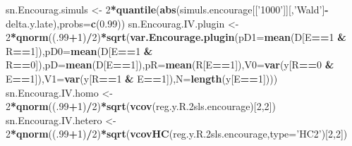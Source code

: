 \documentclass[]{book}
\newenvironment{Shaded}{\begin{snugshade}}{\end{snugshade}}
\newcommand{\KeywordTok}[1]{\textcolor[rgb]{0.13,0.29,0.53}{\textbf{#1}}}
\newcommand{\DataTypeTok}[1]{\textcolor[rgb]{0.13,0.29,0.53}{#1}}
\newcommand{\DecValTok}[1]{\textcolor[rgb]{0.00,0.00,0.81}{#1}}
\newcommand{\FloatTok}[1]{\textcolor[rgb]{0.00,0.00,0.81}{#1}}
\newcommand{\StringTok}[1]{\textcolor[rgb]{0.31,0.60,0.02}{#1}}
\newcommand{\OperatorTok}[1]{\textcolor[rgb]{0.81,0.36,0.00}{\textbf{#1}}}
\newcommand{\NormalTok}[1]{#1}
\theoremstyle{definition}
\theoremstyle{definition}
\theoremstyle{definition}
\theoremstyle{remark}
\begin{document}
\begin{Shaded}
\begin{Highlighting}[]
\NormalTok{sn.Encourag.simuls <-}\StringTok{ }\DecValTok{2}\OperatorTok{*}\KeywordTok{quantile}\NormalTok{(}\KeywordTok{abs}\NormalTok{(simuls.encourage[[}\StringTok{'1000'}\NormalTok{]][,}\StringTok{'Wald'}\NormalTok{]}\OperatorTok{-}\NormalTok{delta.y.late),}\DataTypeTok{probs=}\KeywordTok{c}\NormalTok{(}\FloatTok{0.99}\NormalTok{))}
\NormalTok{sn.Encourag.IV.plugin <-}\StringTok{ }\DecValTok{2}\OperatorTok{*}\KeywordTok{qnorm}\NormalTok{((.}\DecValTok{99}\OperatorTok{+}\DecValTok{1}\NormalTok{)}\OperatorTok{/}\DecValTok{2}\NormalTok{)}\OperatorTok{*}\KeywordTok{sqrt}\NormalTok{(}\KeywordTok{var.Encourage.plugin}\NormalTok{(}\DataTypeTok{pD1=}\KeywordTok{mean}\NormalTok{(D[E}\OperatorTok{==}\DecValTok{1} \OperatorTok{&}\StringTok{ }\NormalTok{R}\OperatorTok{==}\DecValTok{1}\NormalTok{]),}\DataTypeTok{pD0=}\KeywordTok{mean}\NormalTok{(D[E}\OperatorTok{==}\DecValTok{1} \OperatorTok{&}\StringTok{ }\NormalTok{R}\OperatorTok{==}\DecValTok{0}\NormalTok{]),}\DataTypeTok{pD=}\KeywordTok{mean}\NormalTok{(D[E}\OperatorTok{==}\DecValTok{1}\NormalTok{]),}\DataTypeTok{pR=}\KeywordTok{mean}\NormalTok{(R[E}\OperatorTok{==}\DecValTok{1}\NormalTok{]),}\DataTypeTok{V0=}\KeywordTok{var}\NormalTok{(y[R}\OperatorTok{==}\DecValTok{0} \OperatorTok{&}\StringTok{ }\NormalTok{E}\OperatorTok{==}\DecValTok{1}\NormalTok{]),}\DataTypeTok{V1=}\KeywordTok{var}\NormalTok{(y[R}\OperatorTok{==}\DecValTok{1} \OperatorTok{&}\StringTok{ }\NormalTok{E}\OperatorTok{==}\DecValTok{1}\NormalTok{]),}\DataTypeTok{N=}\KeywordTok{length}\NormalTok{(y[E}\OperatorTok{==}\DecValTok{1}\NormalTok{])))}
\NormalTok{sn.Encourag.IV.homo <-}\StringTok{ }\DecValTok{2}\OperatorTok{*}\KeywordTok{qnorm}\NormalTok{((.}\DecValTok{99}\OperatorTok{+}\DecValTok{1}\NormalTok{)}\OperatorTok{/}\DecValTok{2}\NormalTok{)}\OperatorTok{*}\KeywordTok{sqrt}\NormalTok{(}\KeywordTok{vcov}\NormalTok{(reg.y.R.2sls.encourage)[}\DecValTok{2}\NormalTok{,}\DecValTok{2}\NormalTok{])}
\NormalTok{sn.Encourag.IV.hetero <-}\StringTok{ }\DecValTok{2}\OperatorTok{*}\KeywordTok{qnorm}\NormalTok{((.}\DecValTok{99}\OperatorTok{+}\DecValTok{1}\NormalTok{)}\OperatorTok{/}\DecValTok{2}\NormalTok{)}\OperatorTok{*}\KeywordTok{sqrt}\NormalTok{(}\KeywordTok{vcovHC}\NormalTok{(reg.y.R.2sls.encourage,}\DataTypeTok{type=}\StringTok{'HC2'}\NormalTok{)[}\DecValTok{2}\NormalTok{,}\DecValTok{2}\NormalTok{])}
\end{Highlighting}
\end{Shaded}
\end{document}
